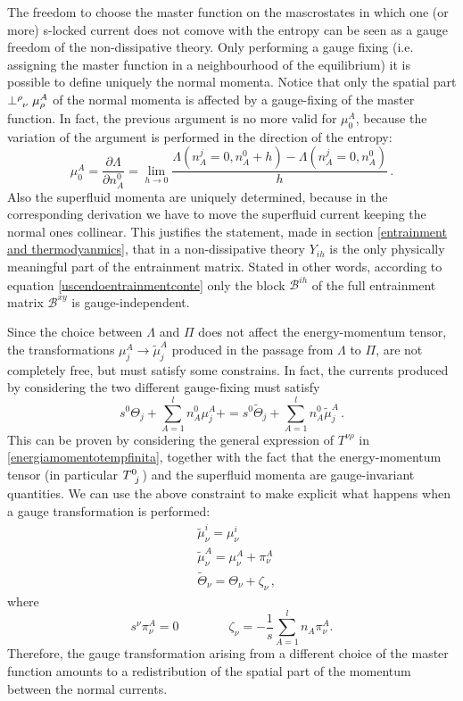 \documentclass[usenatbib]{mnras}
\begin{document}
The freedom to choose the master function on the mascrostates in which one (or more) s-locked current does not comove with the entropy can be seen as a gauge freedom of the non-dissipative theory. Only performing a gauge fixing (i.e. assigning the master function in a neighbourhood of the equilibrium) it is possible to define uniquely the normal momenta. Notice that only the spatial part $ \perp\indices{^\rho_\nu} \mu_{\rho}^A$ of the normal momenta is affected by a gauge-fixing of the master function. In fact, the previous argument is no more valid for $\mu^A_0$, because the variation of the argument is performed in the direction of the entropy:
%
\begin{equation}
\mu_{ 0}^A = \dfrac{\partial \Lambda}{\partial n_{A}^0}  
= 
\lim_{h \rightarrow 0} \dfrac{\Lambda(n_A^j=0, n_{A}^0 + h) -\Lambda(n_A^j=0, n_{A}^0)}{h} \, .
\end{equation}
%
Also the superfluid momenta are uniquely determined, because in the corresponding derivation we have to move the superfluid current keeping the normal ones collinear. This justifies the statement, made in section \ref{entrainment and thermodyanmics}, that in a non-dissipative theory $Y_{ih}$ is the only physically meaningful part of the entrainment matrix. Stated in other words, according to equation \eqref{uscendoentrainmentconte} only the block $\mathcal{B}^{ih}$ of the full entrainment matrix $\mathcal{B}^{xy}$ is gauge-independent.

Since the choice between $\Lambda$ and $\Pi$ does not affect the energy-momentum tensor, the transformations $\mu^A_j \longrightarrow \tilde{\mu}^A_j$ produced in the passage from $\Lambda$ to $\Pi$, are not completely free, but must satisfy some constrains. In fact, the currents produced by considering the two different gauge-fixing must satisfy
%
\begin{equation}
s^0 \Theta_j + \sum_{A=1}^l n_{A}^0 \mu_{ j}^A + = s^0 \tilde{\Theta}_j + \sum_{A=1}^l n_{A}^0 \tilde{\mu}_{ j}^A \, .  
\end{equation}
%
This can be proven by considering the general expression of $T^{\nu \rho}$ in  \eqref{energiamomentotempfinita}, together with the fact that the energy-momentum tensor (in particular $T\indices{^0 _j}$) and the superfluid momenta are gauge-invariant quantities.
We can use the above constraint to make explicit what happens when a gauge transformation is performed:
%
\begin{equation} 
\label{gaugeingenerale}
\begin{split}
&\tilde{\mu}_{ \nu}^i = \mu_{ \nu}^i
\\
&\tilde{\mu}_{ \nu}^A = \mu_{\nu}^A +  \pi_{ \nu}^A
\\
&\tilde{\Theta}_{\nu} = \Theta_\nu + \zeta_\nu \, ,  
\end{split}
\end{equation}
%
where
%
\begin{equation}
\label{bazinga}
s^\nu \pi_{\nu}^A =0 
\qquad \qquad
\zeta_\nu = - \dfrac{1}{s} \sum_{A=1}^l n_{A} \pi_{\nu}^A.
\end{equation}
%
Therefore, the  gauge transformation arising from a different choice of the master function amounts to  a redistribution of the spatial part of the momentum between the normal currents.
\end{document}
